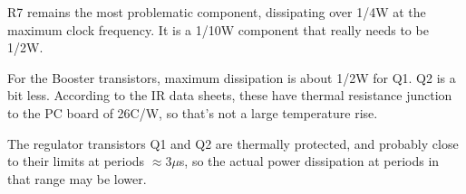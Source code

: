 \documentclass[12pt]{report}
\begin{document}
R7 remains the most problematic component, dissipating over 1/4W at the maximum clock frequency. It is a 1/10W component that really needs to be 1/2W.

For the Booster transistors, maximum dissipation is about 1/2W for Q1. Q2 is a bit less. According to the IR data sheets, these have thermal resistance junction to the PC board of 26C/W, so that's not a large temperature rise.

The regulator transistors Q1 and Q2 are thermally protected, and probably close to their limits at periods $\approx3\mu$s, so the actual power dissipation at periods in that range may be lower.



 
\end{document}

